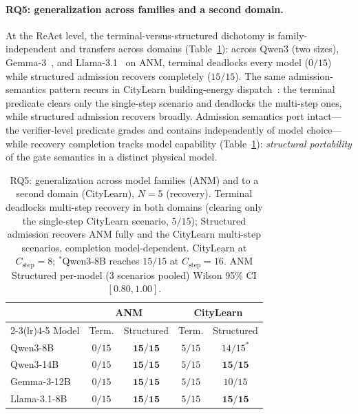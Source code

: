 \documentclass[letterpaper]{article} %
\theoremstyle{plain}
\begin{document}
\paragraph{RQ5: generalization across families and a second domain.}
At the ReAct level, the terminal-versus-structured dichotomy is family-independent and transfers across domains (Table~\ref{tab:gen}): across Qwen3 (two sizes), Gemma-3~\citep{gemma3}, and Llama-3.1~\citep{llama3} on ANM, terminal deadlocks every model ($0/15$) while structured admission recovers completely ($15/15$). The same admission-semantics pattern recurs in CityLearn building-energy dispatch~\citep{citylearn}: the terminal predicate clears only the single-step scenario and deadlocks the multi-step ones, while structured admission recovers broadly. Admission semantics port intact---the verifier-level predicate grades and contains independently of model choice---while recovery completion tracks model capability (Table~\ref{tab:gen}): \emph{structural portability} of the gate semantics in a distinct physical model.

\begin{table}[t]
\centering
\caption{RQ5: generalization across model families (ANM) and to a second domain (CityLearn), $N{=}5$ (recovery). Terminal deadlocks multi-step recovery in both domains (clearing only the single-step CityLearn scenario, $5/15$); Structured admission recovers ANM fully and the CityLearn multi-step scenarios, completion model-dependent. CityLearn at $C_{\text{step}}{=}8$; $^\ast$Qwen3-8B reaches $15/15$ at $C_{\text{step}}{=}16$. ANM Structured per-model ($3$ scenarios pooled) Wilson 95\% CI $[0.80,1.00]$.}
\label{tab:gen}
\footnotesize
\setlength{\tabcolsep}{5pt}
\begin{tabular*}{\columnwidth}{@{\extracolsep{\fill}}lcccc@{}}
\toprule
 & \multicolumn{2}{c}{ANM} & \multicolumn{2}{c}{CityLearn} \\
\cmidrule(lr){2-3}\cmidrule(lr){4-5}
Model & Term. & Structured & Term. & Structured \\
\midrule
Qwen3-8B     & $0/15$ & $\mathbf{15/15}$ & $5/15$ & $14/15^\ast$ \\
Qwen3-14B    & $0/15$ & $\mathbf{15/15}$ & $5/15$ & $\mathbf{15/15}$ \\
Gemma-3-12B  & $0/15$ & $\mathbf{15/15}$ & $5/15$ & $10/15$ \\
Llama-3.1-8B & $0/15$ & $\mathbf{15/15}$ & $5/15$ & $\mathbf{15/15}$ \\
\bottomrule
\end{tabular*}
\end{table}
\end{document}
